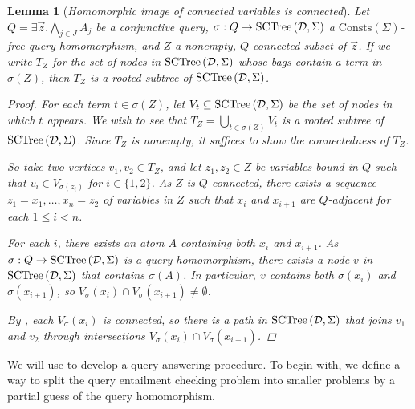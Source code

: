 \documentclass[12pt]{report}
\theoremstyle{plain}
\newtheorem{lemma}[theorem]{Lemma}
\theoremstyle{definition}
\def\Consts{{\mathrm{Consts}}}
\newcommand{\SCTree}[2]{\ensuremath{\normalfont{\textrm{SCTree}} \left( #1, #2 \right)}}
\begin{document}
\begin{lemma}[\emph{Homomorphic image of connected variables is connected}]
\label{image-of-connected-variables-is-connected}
  Let $Q = \exists \vec{z}. \bigwedge_{j \in J} A_j$ be a conjunctive query, $\sigma: Q \rightarrow \SCTree{\mathcal{D}}{\Sigma}$ a $\Consts(\Sigma)$-free query homomorphism, and $Z$ a nonempty, $Q$-connected subset of $\vec{z}$. If we write $T_Z$ for the set of nodes in $\SCTree{\mathcal{D}}{\Sigma}$ whose bags contain a term in $\sigma(Z)$, then $T_Z$ is a rooted subtree of $\SCTree{\mathcal{D}}{\Sigma}$.
  \begin{proof}
    For each term $t \in \sigma(Z)$, let $V_t \subseteq \SCTree{\mathcal{D}}{\Sigma}$ be the set of nodes in which $t$ appears. We wish to see that $T_Z = \bigcup_{t \in \sigma(Z)} V_t$ is a rooted subtree of $\SCTree{\mathcal{D}}{\Sigma}$. Since $T_Z$ is nonempty, it suffices to show the connectedness of $T_Z$.

    So take two vertices $v_1, v_2 \in T_Z$, and let $z_1, z_2 \in Z$ be variables bound in $Q$ such that $v_i \in V_{\sigma(z_i)}$ for $i \in \{1, 2\}$. As $Z$ is $Q$-connected, there exists a sequence $z_1 = x_1, \ldots, x_n = z_2$ of variables in $Z$ such that $x_i$ and $x_{i+1}$ are $Q$-adjacent for each $1 \leq i < n$.

    For each $i$, there exists an atom $A$ containing both $x_i$ and $x_{i+1}$. As \newline $\sigma: Q \rightarrow \SCTree{\mathcal{D}}{\Sigma}$ is a query homomorphism, there exists a node $v$ in $\SCTree{\mathcal{D}}{\Sigma}$ that contains $\sigma(A)$. In particular, $v$ contains both $\sigma(x_i)$ and $\sigma(x_{i+1})$, so $V_\sigma(x_i) \cap V_\sigma(x_{i+1}) \neq \emptyset$.

    By , each $V_\sigma(x_i)$ is connected, so there is a path in $\SCTree{\mathcal{D}}{\Sigma}$ that joins $v_1$ and $v_2$ through intersections $V_\sigma(x_i) \cap V_\sigma(x_{i+1})$.
  \end{proof}
\end{lemma}

We will use  to develop a query-answering procedure. To begin with, we define a way to split the query entailment checking problem into smaller problems by a partial guess of the query homomorphism.
\end{document}
